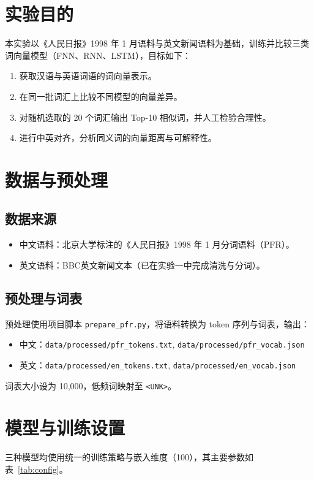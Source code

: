 \documentclass[11pt]{article}
\begin{document}


\section{实验目的}
本实验以《人民日报》1998 年 1 月语料与英文新闻语料为基础，训练并比较三类词向量模型（FNN、RNN、LSTM），目标如下：
\begin{enumerate}
    \item 获取汉语与英语词语的词向量表示。
    \item 在同一批词汇上比较不同模型的向量差异。
    \item 对随机选取的 20 个词汇输出 Top-10 相似词，并人工检验合理性。
    \item 进行中英对齐，分析同义词的向量距离与可解释性。
\end{enumerate}

\section{数据与预处理}
\subsection{数据来源}
\begin{itemize}
    \item 中文语料：北京大学标注的《人民日报》1998 年 1 月分词语料（PFR）。
    \item 英文语料：BBC英文新闻文本（已在实验一中完成清洗与分词）。
\end{itemize}

\subsection{预处理与词表}
预处理使用项目脚本 \texttt{prepare\_pfr.py}，将语料转换为 token 序列与词表，输出：
\begin{itemize}
    \item 中文：\texttt{data/processed/pfr\_tokens.txt}, \texttt{data/processed/pfr\_vocab.json}
    \item 英文：\texttt{data/processed/en\_tokens.txt}, \texttt{data/processed/en\_vocab.json}
\end{itemize}
词表大小设为 10,000，低频词映射至 \texttt{<UNK>}。

\section{模型与训练设置}
三种模型均使用统一的训练策略与嵌入维度（100），其主要参数如表~\ref{tab:config}。
\end{document}
